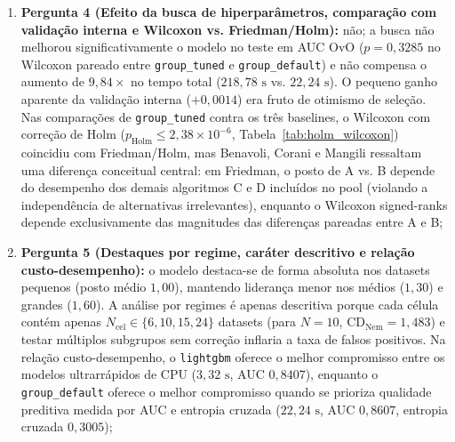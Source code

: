 \documentclass[11pt,a4paper]{article}
\begin{document}
\begin{enumerate}[leftmargin=2em]
    \item \textbf{Pergunta 4 (Efeito da busca de hiperparâmetros, comparação com validação interna e Wilcoxon vs. Friedman/Holm):} não; a busca não melhorou significativamente o modelo no teste em AUC OvO ($p = 0{,}3285$ no Wilcoxon pareado entre \texttt{group\_tuned} e \texttt{group\_default}) e não compensa o aumento de $9{,}84\times$ no tempo total ($218{,}78\text{ s}$ vs. $22{,}24\text{ s}$). O pequeno ganho aparente da validação interna ($+0{,}0014$) era fruto de otimismo de seleção. Nas comparações de \texttt{group\_tuned} contra os três baselines, o Wilcoxon com correção de Holm ($p_{\text{Holm}} \le 2{,}38 \times 10^{-6}$, Tabela~\ref{tab:holm_wilcoxon}) coincidiu com Friedman/Holm, mas Benavoli, Corani e Mangili \cite{benavoli2016should} ressaltam uma diferença conceitual central: em Friedman, o posto de A vs. B depende do desempenho dos demais algoritmos C e D incluídos no pool (violando a independência de alternativas irrelevantes), enquanto o Wilcoxon signed-ranks depende exclusivamente das magnitudes das diferenças pareadas entre A e B;
    \item \textbf{Pergunta 5 (Destaques por regime, caráter descritivo e relação custo-desempenho):} o modelo destaca-se de forma absoluta nos datasets pequenos (posto médio $1{,}00$), mantendo liderança menor nos médios ($1{,}30$) e grandes ($1{,}60$). A análise por regimes é apenas descritiva porque cada célula contém apenas $N_{\text{cel}} \in \{6, 10, 15, 24\}$ datasets (para $N = 10$, $\mathrm{CD}_{\mathrm{Nem}} = 1{,}483$) e testar múltiplos subgrupos sem correção inflaria a taxa de falsos positivos. Na relação custo-desempenho, o \texttt{lightgbm} oferece o melhor compromisso entre os modelos ultrarrápidos de CPU ($3{,}32\text{ s}$, AUC $0{,}8407$), enquanto o \texttt{group\_default} oferece o melhor compromisso quando se prioriza qualidade preditiva medida por AUC e entropia cruzada ($22{,}24\text{ s}$, AUC $0{,}8607$, entropia cruzada $0{,}3005$);

\end{enumerate}
\end{document}
